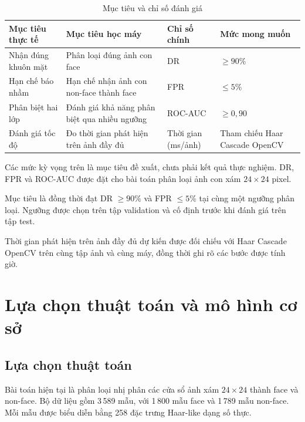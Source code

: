 \documentclass[12pt,a4paper,oneside]{report}
\begin{document}
\begin{table}[H]
  \centering
  \caption{Mục tiêu và chỉ số đánh giá}
  \label{tab:muctieu}
  \begin{tabularx}{\textwidth}{>{\raggedright\arraybackslash}X >{\raggedright\arraybackslash}X
                               >{\centering\arraybackslash}p{2.8cm} >{\centering\arraybackslash}p{2.8cm}}
    \toprule
    \textbf{Mục tiêu thực tế} & \textbf{Mục tiêu học máy} & \textbf{Chỉ số chính} & \textbf{Mức mong muốn} \\
    \midrule
   Nhận đúng khuôn mặt
& Phân loại đúng ảnh con face
& DR
& $\geq 90\%$ \\

Hạn chế báo nhầm
& Hạn chế nhận ảnh con non-face thành face
& FPR
& $\leq 5\%$ \\

Phân biệt hai lớp
& Đánh giá khả năng phân biệt qua nhiều ngưỡng
& ROC-AUC
& $\geq 0{,}90$ \\

Đánh giá tốc độ
& Đo thời gian phát hiện trên ảnh đầy đủ
& Thời gian (ms/ảnh)
& Tham chiếu Haar Cascade OpenCV \\
    \bottomrule
  \end{tabularx}
\end{table}
Các mức kỳ vọng trên là mục tiêu đề xuất, chưa phải
kết quả thực nghiệm. DR, FPR và ROC-AUC được đặt cho
bài toán phân loại ảnh con xám $24 \times 24$ pixel.

Mục tiêu là đồng thời đạt DR $\geq 90\%$ và
FPR $\leq 5\%$ tại cùng một ngưỡng phân loại.
Ngưỡng được chọn trên tập validation và cố định
trước khi đánh giá trên tập test.

Thời gian phát hiện trên ảnh đầy đủ dự kiến được
đối chiếu với Haar Cascade OpenCV trên cùng tập ảnh
và cùng máy, đồng thời ghi rõ các bước được tính giờ.
\section{Lựa chọn thuật toán và mô hình cơ sở}
\subsection{Lựa chọn thuật toán}

Bài toán hiện tại là phân loại nhị phân các cửa sổ
ảnh xám $24 \times 24$ thành face và non-face.
Bộ dữ liệu gồm 3\,589 mẫu, với 1\,800 mẫu face
và 1\,789 mẫu non-face.
Mỗi mẫu được biểu diễn bằng 258 đặc trưng Haar-like
dạng số thực.
\end{document}
